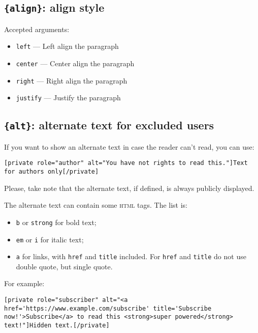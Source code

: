 \subsection{\texttt{\{align\}}: align style}

Accepted arguments:

\begin{itemize}
 \item \verb+left+ --- Left align the paragraph
 \item \verb+center+ --- Center align the paragraph
 \item \verb+right+ --- Right align the paragraph
 \item \verb+justify+ --- Justify the paragraph
\end{itemize}

\subsection{\texttt{\{alt\}}: alternate text for excluded users}

If you want to show an alternate text in case the reader can't read, you can
use:

\begin{lstlisting}
[private role="author" alt="You have not rights to read this."]Text for authors only[/private]
\end{lstlisting}

Please, take note that the alternate text, if defined, is always publicly
displayed.

The alternate text can contain some \textsc{html} tags. The list is:

\begin{itemize}
 \item \verb+b+ or \verb+strong+ for bold text;
 \item \verb+em+ or \verb+i+ for italic text;
 \item \verb+a+ for links, with \verb+href+ and \verb+title+ included. For
 \verb+href+ and \verb+title+ do not use double quote, but single quote.
\end{itemize}

For example:

\begin{lstlisting}
[private role="subscriber" alt="<a href='https://www.example.com/subscribe' title='Subscribe now!'>Subscribe</a> to read this <strong>super powered</strong> text!"]Hidden text.[/private]
\end{lstlisting}

